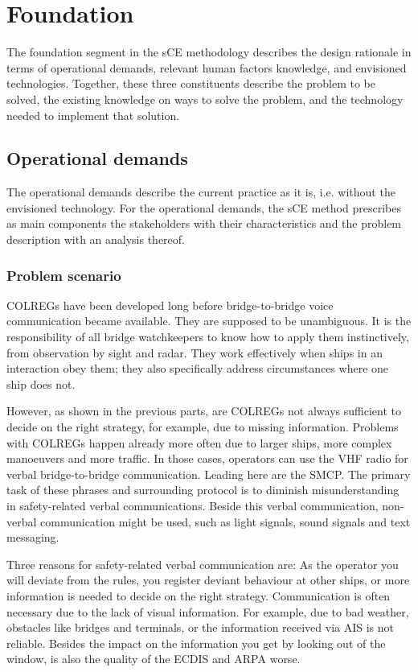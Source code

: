 \chapter{Foundation}
The foundation segment in the \acf{sCE} methodology describes the design rationale in terms of operational demands, relevant human factors knowledge, and envisioned technologies. Together, these three constituents describe the problem to be solved, the existing knowledge on ways to solve the problem, and the technology needed to implement that solution.

\section{Operational demands}
The operational demands describe the current practice as it is, i.e. without the envisioned technology. For the operational demands, the sCE method prescribes as main components the stakeholders with their characteristics and the problem description with an analysis thereof.

\subsection{Problem scenario}
\acf{COLREGs} have been developed long before bridge-to-bridge voice communication became available. They are supposed to be unambiguous. It is the responsibility of all bridge watchkeepers to know how to apply them instinctively, from observation by sight and radar. They work effectively when ships in an interaction obey them; they also specifically address circumstances where one ship does not.

However, as shown in the previous parts, are \ac{COLREGs} not always sufficient to decide on the right strategy, for example, due to missing information. Problems with \ac{COLREGs} happen already more often due to larger ships, more complex manoeuvers and more traffic. In those cases, operators can use the \ac{VHF} radio for verbal bridge-to-bridge communication. Leading here are the \acf{SMCP}. The primary task of these phrases and surrounding protocol is to diminish misunderstanding in safety-related verbal communications. Beside this verbal communication, non-verbal communication might be used, such as light signals, sound signals and text messaging.

Three reasons for safety-related verbal communication are: As the operator you will deviate from the rules, you register deviant behaviour at other ships, or more information is needed to decide on the right strategy. Communication is often necessary due to the lack of visual information. For example, due to bad weather, obstacles like bridges and terminals, or the information received via \ac{AIS} is not reliable. Besides the impact on the information you get by looking out of the window, is also the quality of the \acf{ECDIS} and \acf{ARPA} worse.

